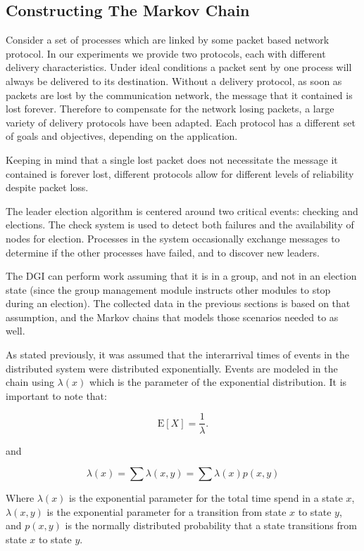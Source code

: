 \subsection{Constructing The Markov Chain}

Consider a set of processes which are linked by some packet based network
protocol. In our experiments we provide two protocols, each with different
delivery characteristics. Under ideal conditions a packet sent by one process
will always be delivered to its destination. Without a delivery protocol, as
soon as packets are lost by the communication network, the message that it
contained is lost forever. Therefore to compensate for the network losing
packets, a large variety of delivery protocols have been adapted. Each protocol
has a different set of goals and objectives, depending on the application.

Keeping in mind that a single lost packet does not necessitate the message it
contained is forever lost, different protocols allow for different levels of
reliability despite packet loss.

The leader election algorithm is centered around two critical events: checking
and elections. The check system is used to detect both failures and the
availability of nodes for election. Processes in the system occasionally exchange 
messages to determine if the other processes have failed, and to discover new
leaders. 

The DGI can perform work assuming that it is in a group, and not in an election
state (since the group management module instructs other modules to stop during
an election). The collected data in the previous sections is based on that
assumption, and the Markov chains that models those scenarios needed to as
well.

As stated previously, it was assumed that the interarrival times of events in the distributed system
were distributed exponentially. Events are modeled in the chain
using $\lambda(x)$ which is the parameter of the exponential distribution. It
is important to note that:

\begin{equation}
\mathrm{E}[X] = \frac{1}{\lambda}. \!
\end{equation}

and

\begin{equation}
\lambda(x) = \sum \lambda(x,y) = \sum \lambda(x) p(x,y)
\end{equation}

Where $\lambda(x)$ is the exponential parameter for the total time spend in
a state $x$, $\lambda(x,y)$ is the exponential parameter for a transition from
state $x$ to state $y$, and $p(x,y)$ is the normally distributed probability that
a state transitions from state $x$ to state $y$.

